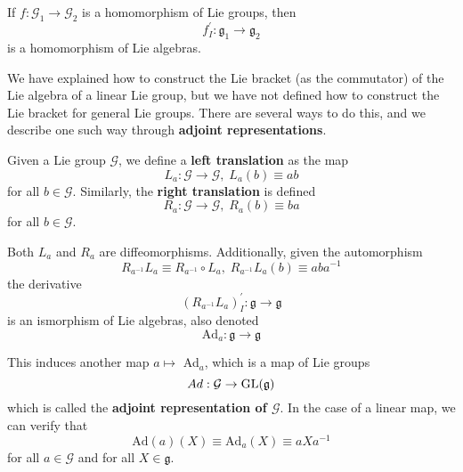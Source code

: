   \begin{theorem}
    If $f: \mathcal{G}_1 \rightarrow \mathcal{G}_2$ is a homomorphism of Lie groups, then 
    \begin{equation}
      f_I^\prime: \mathfrak{g}_1 \rightarrow \mathfrak{g}_2
    \end{equation}
    is a homomorphism of Lie algebras. 
  \end{theorem}

  We have explained how to construct the Lie bracket (as the commutator) of the Lie algebra of a linear Lie group, but we have not defined how to construct the Lie bracket for general Lie groups. There are several ways to do this, and we describe one such way through \textbf{adjoint representations}. 

  \begin{definition}
    Given a Lie group $\mathcal{G}$, we define a \textbf{left translation} as the map
    \begin{equation}
      L_a: \mathcal{G} \rightarrow \mathcal{G}, \; L_a (b) \equiv a b
    \end{equation}
    for all $b \in \mathcal{G}$. Similarly, the \textbf{right translation} is defined
    \begin{equation}
      R_a: \mathcal{G} \rightarrow \mathcal{G}, \; R_a (b) \equiv b a
    \end{equation}
    for all $b \in \mathcal{G}$. 
  \end{definition}

  Both $L_a$ and $R_a$ are diffeomorphisms. Additionally, given the automorphism
  \begin{equation}
    R_{a^{-1}} L_a \equiv R_{a^{-1}} \circ L_a, \; R_{a^{-1}} L_a (b) \equiv a b a^{-1}
  \end{equation}
  the derivative
  \begin{equation}
    (R_{a^{-1}} L_a)^\prime_I: \mathfrak{g} \rightarrow \mathfrak{g}
  \end{equation}
  is an ismorphism of Lie algebras, also denoted 
  \begin{equation}
    \text{Ad}_a: \mathfrak{g} \rightarrow \mathfrak{g}
  \end{equation}

  \begin{definition}
    This induces another map $a \mapsto$ Ad$_a$, which is a map of Lie groups
    \begin{equation}
      Ad: \mathcal{G} \rightarrow \operatorname{GL}(\mathcal{\mathfrak{g}})
    \end{equation}
    which is called the \textbf{adjoint representation of $\mathcal{G}$}. In the case of a linear map, we can verify that 
    \begin{equation}
      \text{Ad}(a) (X) \equiv \text{Ad}_a (X) \equiv a X a^{-1}
    \end{equation}
    for all $a \in \mathcal{G}$ and for all $X \in \mathfrak{g}$. 
  \end{definition}

